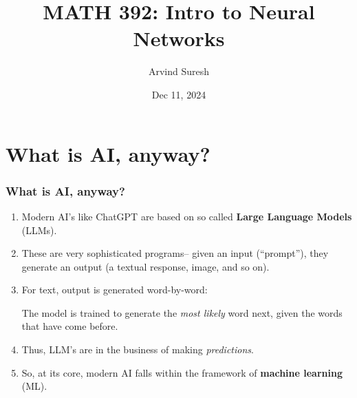 \documentclass{beamer}
\title{MATH 392: Intro to Neural Networks}
\author{Arvind Suresh}
\date[Dec 11, 2024]
 {Dec 11, 2024}
\theoremstyle{definition}
\begin{document}
\frame{\titlepage} %
\section[Outline]{}
\frame{\tableofcontents}






\section{What is AI, anyway?}
 
\frame
{\frametitle{What is AI, anyway?}

\vspace{0.1in}

\begin{enumerate}[$\bullet$]
    \item Modern AI's like ChatGPT are based on so called \textbf{Large Language Models} (LLMs). \vspace{0.1in} 
    \pause
    \item These are very sophisticated programs-- given an input (``prompt''), they generate an output (a textual response, image, and so on). \vspace{0.1in} 
    \pause
    \item For text, output is generated word-by-word:
    
    The model is trained to generate the \emph{most likely} word next, given the words that have come before.\vspace{0.1in}
    \pause
    \item Thus,  LLM's are in the business of making \emph{predictions}. \vspace{0.1in} 
    \pause
    \item So, at its core, modern AI falls within the framework of \textbf{machine learning} (ML).
\end{enumerate}

\vspace{0.15in}
}
\end{document}
